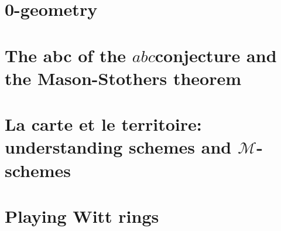 \documentclass[a4paper]{memoir}
\begin{document}
\chapter{0-geometry}
\label{chapter:prep-notes}






\chapter{The abc of the \texorpdfstring{$abc$}-conjecture and the Mason-Stothers theorem}





\chapter{La carte et le territoire: understanding schemes and \texorpdfstring{$\mathcal{M}$}{M}-schemes}








\chapter{Playing Witt rings}



\end{document}
